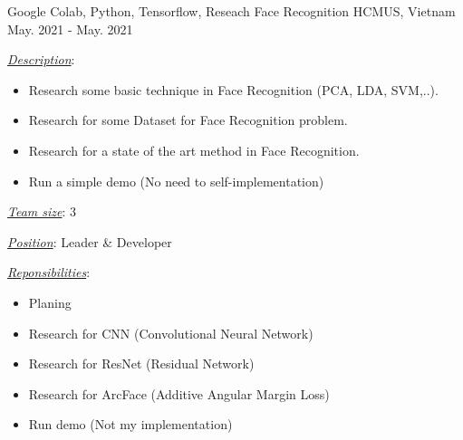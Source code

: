 \begin{cventries}
  \cventry
    {Google Colab, Python, Tensorflow, Reseach} %
    {Face Recognition} %
    {HCMUS, Vietnam} %
    {May. 2021 - May. 2021} %
    {
      \begin{cvitems} %
        \item \underline{\textit{Description}}:
        \begin{itemize}
          \item Research some basic technique in Face Recognition (PCA, LDA, SVM,..).
          \item Research for some Dataset for Face Recognition problem.
          \item Research for a state of the art method in Face Recognition.
          \item Run a simple demo (No need to self-implementation)
        \end{itemize}
        \item \underline{\textit{Team size}}: 3
        \item \underline{\textit{Position}}: Leader \& Developer
        \item \underline{\textit{Reponsibilities}}: 
        \begin{itemize}
          \item Planing
          \item Research for CNN (Convolutional Neural Network)
          \item Research for ResNet (Residual Network)
          \item Research for ArcFace (Additive Angular Margin Loss)
          \item Run demo (Not my implementation)
        \end{itemize}
      \end{cvitems}
    }


\end{cventries}
